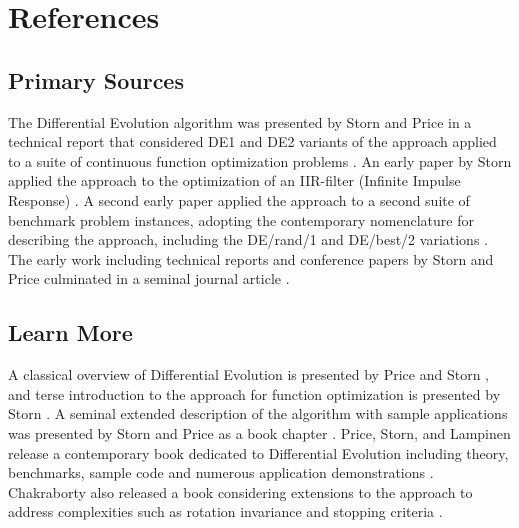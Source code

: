 \documentclass[a4paper, 11pt]{article}
\begin{document}



\section{References}
\label{sec:references}

% 
% 
\subsection{Primary Sources}
The Differential Evolution algorithm was presented by Storn and Price in a technical report that considered DE1 and DE2 variants of the approach applied to a suite of continuous function optimization problems \cite{Storn1995}. 
An early paper by Storn applied the approach to the optimization of an IIR-filter (Infinite Impulse Response) \cite{Storn1996a}. A second early paper applied the approach to a second suite of benchmark problem instances, adopting the contemporary nomenclature for describing the approach, including the DE/rand/1 and DE/best/2 variations \cite{Storn1996b}.
The early work including technical reports and conference papers by Storn and Price culminated in a seminal journal article \cite{Storn1997}.

% 
% 
\subsection{Learn More}
A classical overview of Differential Evolution is presented by Price and Storn \cite{Price1997}, and terse introduction to the approach for function optimization is presented by Storn \cite{Storn1996}. A seminal extended description of the algorithm with sample applications was presented by Storn and Price as a book chapter \cite{Price1999}.
Price, Storn, and Lampinen release a contemporary book dedicated to Differential Evolution including theory, benchmarks, sample code and numerous application demonstrations \cite{Price2005}. Chakraborty also released a book considering extensions to the approach to address complexities such as rotation invariance and stopping criteria  \cite{Chakraborty2008}.
\end{document}
